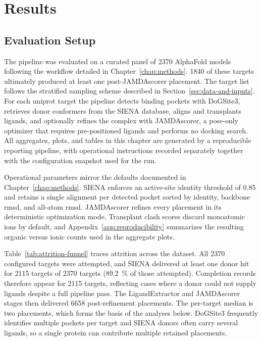 \chapter{Results}
\label{chap:results}

\section{Evaluation Setup}
\label{sec:results-setup}
The pipeline was evaluated on a curated panel of \num{2370} AlphaFold models following the workflow detailed in Chapter~\ref{chap:methods}. \num{1840} of these targets ultimately produced at least one post-JAMDAscorer placement. The target list follows the stratified sampling scheme described in Section~\ref{sec:data-and-inputs}. For each \gls{uniprot} target the pipeline detects binding pockets with DoGSite3, retrieves donor conformers from the SIENA database, aligns and transplants ligands, and optionally refines the complex with JAMDAscorer, a pose-only optimizer that requires pre-positioned ligands and performs no docking search. All aggregates, plots, and tables in this chapter are generated by a reproducible reporting pipeline, with operational instructions recorded separately together with the configuration snapshot used for the run.

Operational parameters mirror the defaults documented in Chapter~\ref{chap:methods}. SIENA enforces an active-site identity threshold of \num{0.85} and retains a single alignment per detected pocket sorted by identity, backbone \gls{rmsd}, and all-atom \gls{rmsd}. JAMDAscorer refines every placement in its deterministic optimization mode. Transplant clash scores discard monoatomic ions by default, and Appendix~\ref{app:reproducibility} summarizes the resulting organic versus ionic counts used in the aggregate plots.

Table~\ref{tab:attrition-funnel} traces attrition across the dataset. All \num{2370} configured targets were attempted, and SIENA delivered at least one donor hit for \num{2115} targets of \num{2370} targets (\SI{89.2}{\percent} of those attempted). Completion records therefore appear for \num{2115} targets, reflecting cases where a donor could not supply ligands despite a full pipeline pass. The LigandExtractor and JAMDAscorer stages then delivered \num{6658} post-refinement placements. The per-target median is two placements, which forms the basis of the analyses below. DoGSite3 frequently identifies multiple pockets per target and SIENA donors often carry several ligands, so a single protein can contribute multiple retained placements.

